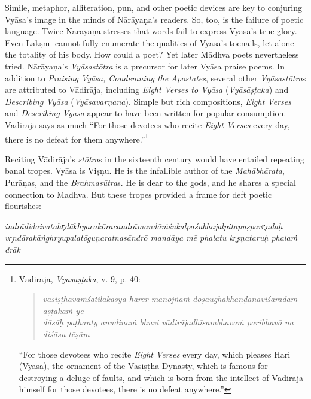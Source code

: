 Simile, metaphor, alliteration, pun, and other poetic devices are key to conjuring Vyāsa’s image in the minds of Nārāyaṇa’s readers. So, too, is the failure of poetic language. Twice Nārāyaṇa stresses that words fail to express Vyāsa’s true glory. Even Lakṣmī cannot fully enumerate the qualities of Vyāsa’s toenails, let alone the totality of his body. How could a poet? Yet later Mādhva poets nevertheless tried. Nārāyaṇa’s \emph{{Vyāsastōtra}} is a precursor for later Vyāsa praise poems. In addition to \emph{Praising Vyāsa, Condemning the Apostates}, several other \emph{{Vyāsastōtra}}s are attributed to Vādirāja, including \emph{Eight Verses to Vyāsa} (\emph{{Vyāsāṣṭaka}}) and \emph{Describing Vyāsa} (\emph{{Vyāsavarṇana}}). Simple but rich compositions, \emph{Eight Verses} and \emph{Describing Vyāsa} appear to have been written for popular consumption. Vādirāja says as much  \Dash  “For those devotees who recite \emph{Eight Verses} every day, there is no defeat for them anywhere.”\footnote{%
Vādirāja, \emph{{Vyāsāṣṭaka}}, v. 9, p. 40:\setlength{\parindent}{2em}

\vspace{-1.5ex}\begin{quote}\raggedright
      \emph{vāsiṣṭhavaṁśatilakasya harēr manōjñaṁ dōṣaughakhaṇḍanaviśāradam aṣṭakaṁ yē}\\
\emph{dāsāḥ paṭhanty anudinaṁ bhuvi vādirājadhīsambhavaṁ paribhavō na diśāsu tēṣām}\end{quote}\vspace{-1.5ex}
      

\noindent{}“For those devotees who recite \emph{Eight Verses} every day, which pleases Hari (Vyāsa), the ornament of the Vāsiṣṭha Dynasty, which is famous for destroying a deluge of faults, and which is born from the intellect of Vādirāja himself  \Dash  for those devotees, there is no defeat anywhere.”
}



Reciting Vādirāja’s \emph{stōtra}s in the sixteenth century would have entailed repeating banal tropes. Vyāsa is Viṣṇu. He is the infallible author of the \emph{Mahābhārata}, Purāṇas, and the \emph{{Brahmasūtra}}s. He is dear to the gods, and he shares a special connection to Madhva. But these tropes provided a frame for deft poetic flourishes: 

\begin{pullquote}\raggedright
      \emph{indrādidaivatahr̥dākhyacakōracandrāmandāṁśukalpaśubhajalpitapuṣpavr̥ndaḥ}\\
\emph{vr̥ndārakāṅghryupalatōguṇaratnasāndrō mandāya mē phalatu kr̥ṣṇataruḥ phalaṁ drāk}
\end{pullquote}
      
